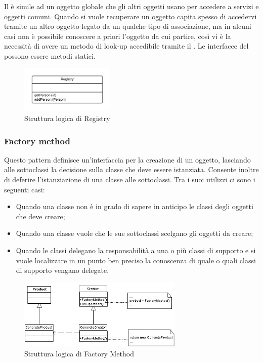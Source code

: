 Il  è simile ad un oggetto globale che gli altri oggetti usano per accedere a servizi e oggetti comuni. Quando si vuole recuperare un oggetto capita spesso di accedervi tramite un altro oggetto legato da un qualche tipo di associazione, ma in alcuni casi non è possibile conoscere a priori l'oggetto da cui partire, così vi è la necessità di avere un metodo di look-up accedibile tramite il . Le interfacce del  possono essere metodi statici.

\begin{figure}[H]
\centering \includegraphics[width=0.4\textwidth]{patterns/registry.png}
\caption{Struttura logica di Registry}
\label{fig:registry}
\end{figure}

\subsubsection{Factory method}
	
Questo pattern definisce un'interfaccia per la creazione di un oggetto, lasciando alle sottoclassi la decisione sulla classe che deve essere istanziata. Consente inoltre di deferire l'istanziazione di una classe alle sottoclassi. Tra i suoi utilizzi ci sono i seguenti casi:

\begin{itemize}

	\item Quando una classe non è in grado di sapere in anticipo le classi degli oggetti che deve creare;
	\item Quando una classe vuole che le sue sottoclassi scelgano gli oggetti da creare;
	\item Quando le classi delegano la responsabilità a una o più classi di supporto e si vuole localizzare in un punto ben preciso la conoscenza di quale o quali classi di supporto vengano delegate.

\end{itemize}

\begin{figure}[H]
\centering \includegraphics[width=0.7\textwidth]{patterns/factory-method.jpg}
\caption{Struttura logica di Factory Method}
\label{fig:factory-method}
\end{figure}

